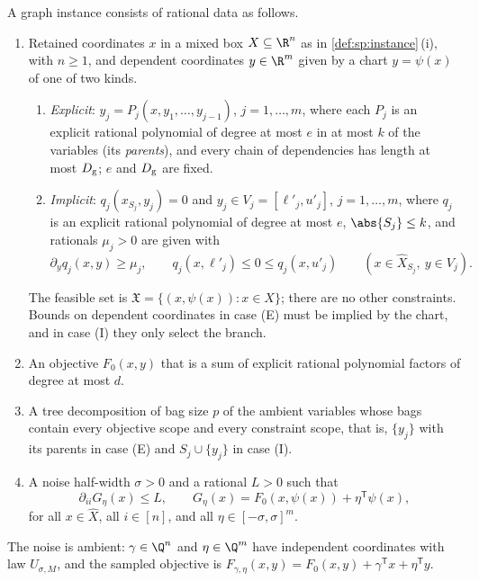 \begin{definition}\label{def:con:graph}
A graph instance consists of rational data as follows.
\begin{enumerate}[label=(\roman*)]
\item Retained coordinates $x$ in a mixed box $X\subseteq\R^n$ as in
\cref{def:sp:instance}\,(i), with $n\ge1$, and dependent coordinates
$y\in\R^m$ given by a chart $y=\psi(x)$ of one of two kinds.
\begin{enumerate}[label=(\Alph*)]
\item[(E)] \emph{Explicit}: $y_j=P_j(x,y_1,\dots,y_{j-1})$, $j=1,\dots,m$,
where each $P_j$ is an explicit rational polynomial of degree at most $e$
in at most $k$ of the variables (its \emph{parents}), and every chain of
dependencies has length at most $D_{\rm g}$; $e$ and $D_{\rm g}$ are fixed.
\item[(I)] \emph{Implicit}: $q_j(x_{S_j},y_j)=0$ and $y_j\in V_j=[\ell'_j,u'_j]$,
$j=1,\dots,m$, where $q_j$ is an explicit rational polynomial of degree at
most $e$, $\abs{S_j}\le k$, and rationals $\mu_j>0$ are given with
\begin{equation}\label{eq:con:bracket}
 \partial_yq_j(x,y)\ge\mu_j,\qquad q_j(x,\ell'_j)\le0\le q_j(x,u'_j)
 \qquad(x\in\widehat X_{S_j},\ y\in V_j).
\end{equation}
\end{enumerate}
The feasible set is $\mathfrak X=\{(x,\psi(x)):x\in X\}$; there are no other
constraints. Bounds on dependent coordinates in case (E) must be implied by
the chart, and in case (I) they only select the branch.
\item An objective $F_0(x,y)$ that is a sum of explicit rational polynomial
factors of degree at most $d$.
\item A tree decomposition of bag size $p$ of the ambient variables whose
bags contain every objective scope and every constraint scope, that is,
$\{y_j\}$ with its parents in case (E) and $S_j\cup\{y_j\}$ in case (I).
\item A noise half-width $\sigma>0$ and a rational $L>0$ such that
\begin{equation}\label{eq:con:curv}
 \partial_{ii}G_\eta(x)\le L,\qquad
 G_\eta(x)=F_0(x,\psi(x))+\eta^{\mathsf T}\psi(x),
\end{equation}
for all $x\in\widehat X$, all $i\in[n]$, and all $\eta\in[-\sigma,\sigma]^m$.
\end{enumerate}
The noise is ambient: $\gamma\in\Q^n$ and $\eta\in\Q^m$ have independent
coordinates with law $U_{\sigma,M}$, and the sampled objective is
$F_{\gamma,\eta}(x,y)=F_0(x,y)+\gamma^{\mathsf T}x+\eta^{\mathsf T}y$.
\end{definition}

